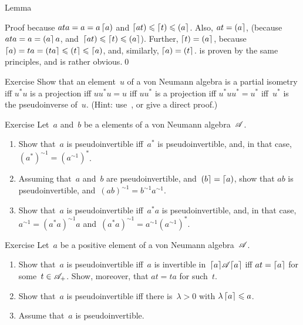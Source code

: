 \documentclass[a]{subfiles}
\begin{document}
\begin{parsec}
\begin{point}{Lemma}
\begin{point}{Proof}
because $ata=a=a\left\lceil a\right)$
and $\left\lceil at\right)\leqslant\left\lceil t\right)\leqslant\left(a\right\rceil$.
Also, $at=\left(a\right\rceil$,
(because~$ata=a=\left(a\right\rceil a$,
and~$\left\lceil at\right)\leqslant\left\lceil t\right)\leqslant \left(a\right\rceil$).
Further, $\left\lceil t\right)=\left(a\right\rceil$,
because $\left\lceil a\right)=ta=\left(ta\right\rceil\leqslant \left(t\right\rceil\leqslant \left\lceil a\right)$,
and, similarly, $\left\lceil a\right)=\left(t\right\rceil$.
\grayed{(\ref{pseudoinverse-4}$
	\Longrightarrow$%
\ref{pseudoinverse-5})}
is proven by the same principles, and
\grayed{(\ref{pseudoinverse-5}$
	\Longrightarrow$%
\ref{pseudoinverse-1},\ref{pseudoinverse-3})}
is rather obvious.\qed
\end{point}
\end{point}
\begin{point}{Exercise}%
Show that an element~$u$ of a von Neumann algebra
is a partial isometry iff
$u^*u$ is a projection
iff $uu^*u=u$
iff $uu^*$ is a projection
iff $u^*uu^*=u^*$
iff~$u^*$ is the pseudoinverse of~$u$.
(Hint: use~,
or give a direct proof.)
\end{point}
\begin{point}{Exercise}%
Let~$a$ and~$b$ be a elements of a von Neumann algebra~$\mathscr{A}$.
\begin{enumerate}
\item
Show that~$a$ is pseudoinvertible
iff~$a^*$ is pseudoinvertible,
and, in that case, $(a^*)^{\sim1}=(a^{\sim1})^*$.
\item
Assuming that~$a$ and~$b$ are pseudoinvertible,
and~$\left(b\right\rceil=\left\lceil a\right)$,
show that $ab$ is pseudoinvertible,
and~$(ab)^{\sim1}=b^{\sim1}a^{\sim1}$.


\item
Show that~$a$ is pseudoinvertible
iff~$a^*a$ is pseudoinvertible,
and, in that case, $a^{\sim 1} = (a^*a)^{\sim1}a$
and~$(a^*a)^{\sim1}=a^{\sim1}(a^{\sim1})^*$.
\end{enumerate}
\end{point}
\begin{point}{Exercise}%
Let~$a$ be a positive element of a von Neumann algebra~$\mathscr{A}$.
\begin{enumerate}
\item
Show that~$a$ is pseudoinvertible iff~$a$
is invertible in~$\left\lceil a\right\rceil\!\mathscr{A}\!\left\lceil a\right\rceil$
iff $at=\left\lceil a\right\rceil$ for some~$t\in\mathscr{A}_+$.
Show, moreover, that $at=ta$ for such~$t$.
\item
Show that~$a$ is pseudoinvertible iff
there is~$\lambda>0$ with $\lambda \left\lceil a\right\rceil\leqslant a$.
\item
Assume that~$a$ is pseudoinvertible.


\end{enumerate}
\end{point}
\end{parsec}
\end{document}
